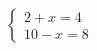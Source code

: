 \documentclass[preview]{standalone}
\begin{document}
\begin{align*}
\left\{ \begin{array}{cl} 2 + x = 4 \\ 10 - x = 8 \end{array} \right.
\end{align*}
\end{document}
